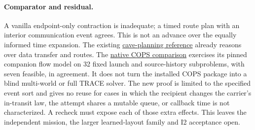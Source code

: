 \documentclass[11pt]{article}
\begin{document}
\paragraph{Comparator and residual.}
A vanilla endpoint-only contraction is inadequate; a timed route plan
with an interior communication event agrees. This is not an advance over
the equally informed time expansion. The existing
\href{https://superintelligence.jpl.nasa.gov/public/documents/papers/PlanRob-2020-Planning-and-Optimization-for-Multi-Robot-Planetary-Cave-Exploration.pdf}{cave-planning
reference} already reasons over data transfer and routes. The
\href{cops-comparison/README.md}{native COPS comparison} exercises its
pinned companion flow model on 32 fixed launch and source-history
subproblems, with seven feasible, in agreement. It does not turn the
installed COPS package into a blind multi-world or full TRACE solver.
The new proof is limited to the specified event sort and gives no reuse
for cases in which the recipient changes the carrier's in-transit law,
the attempt shares a mutable queue, or callback time is not characterized.
A recheck must expose each of those extra effects. This leaves the
independent mission, the larger learned-layout family and I2 acceptance
open.
\end{document}
